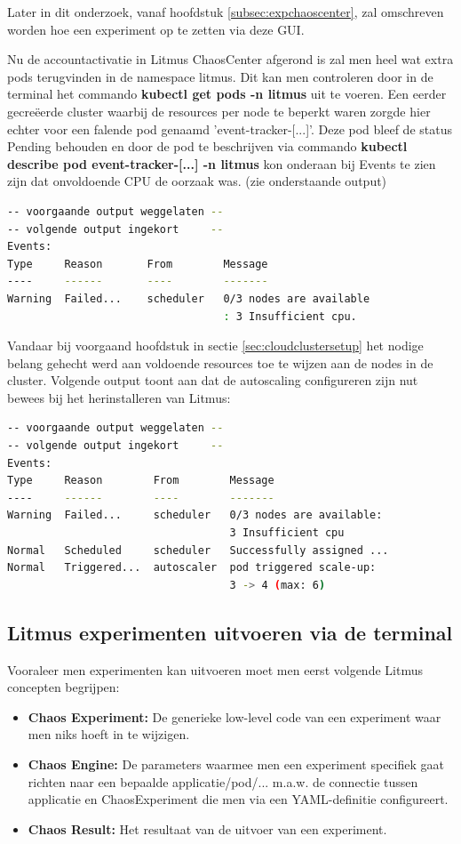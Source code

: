 Later in dit onderzoek, vanaf hoofdstuk \ref{subsec:expchaoscenter}, zal omschreven worden hoe een experiment op te zetten via deze GUI. 
 
Nu de accountactivatie in Litmus ChaosCenter afgerond is zal men heel wat extra pods terugvinden in de namespace litmus. Dit kan men controleren door in de terminal het commando {\bf kubectl get pods -n litmus} uit te voeren. Een eerder gecreëerde cluster waarbij de resources per node te beperkt waren zorgde hier echter voor een falende pod genaamd 'event-tracker-[...]'. Deze pod bleef de status Pending behouden en door de pod te beschrijven via commando {\bf kubectl describe pod event-tracker-[...] -n litmus} kon onderaan bij Events te zien zijn dat onvoldoende CPU de oorzaak was. (zie onderstaande output)
 
\begin{lstlisting}[language=bash]
-- voorgaande output weggelaten --
-- volgende output ingekort     --
Events:
Type     Reason       From        Message
----     ------       ----        -------
Warning  Failed...    scheduler   0/3 nodes are available
                                  : 3 Insufficient cpu.
\end{lstlisting}
 
Vandaar bij voorgaand hoofdstuk in sectie \ref {sec:cloudclustersetup} het nodige belang gehecht werd aan voldoende resources toe te wijzen aan de nodes in de cluster. Volgende output toont aan dat de autoscaling configureren zijn nut bewees bij het herinstalleren van Litmus: 

\begin{lstlisting}[language=bash]
-- voorgaande output weggelaten --
-- volgende output ingekort     --
Events:
Type     Reason        From        Message
----     ------        ----        -------
Warning  Failed...     scheduler   0/3 nodes are available: 
                                   3 Insufficient cpu
Normal   Scheduled     scheduler   Successfully assigned ... 
Normal   Triggered...  autoscaler  pod triggered scale-up: 
                                   3 -> 4 (max: 6)
\end{lstlisting}

\subsection{Litmus experimenten uitvoeren via de terminal}

Vooraleer men experimenten kan uitvoeren moet men eerst volgende Litmus concepten begrijpen:
\begin{itemize}
    \item {\bf Chaos Experiment:} De generieke low-level code van een experiment waar men niks hoeft in te wijzigen.
    \item {\bf Chaos Engine:} De parameters waarmee men een experiment specifiek gaat richten naar een bepaalde applicatie/pod/... m.a.w. de connectie tussen applicatie en ChaosExperiment die men via een YAML-definitie configureert.
    \item {\bf Chaos Result:} Het resultaat van de uitvoer van een experiment. 
\end{itemize} 
 

